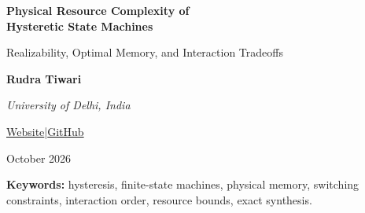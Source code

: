 \documentclass[12pt,letterpaper]{article}
\theoremstyle{definition}\newtheorem{definition}[theorem]{Definition}
\theoremstyle{remark}\newtheorem{remark}[theorem]{Remark}
\begin{document}
\thispagestyle{empty}
\begin{center}
\vspace*{0.26in}
{\LARGE\bfseries Physical Resource Complexity of\\[.15em] Hysteretic State Machines\par}
\vspace{.25in}
{\large Realizability, Optimal Memory, and Interaction Tradeoffs\par}
\vspace{.26in}
{\normalsize\bfseries Rudra Tiwari\par}
\vspace{.025in}
{\normalsize\itshape University of Delhi, India\par}
\vspace{.10in}
{\small\href{https://rtx09x.github.io}{Website}\quad|\quad\href{https://github.com/Rtx09x}{GitHub}\par}
\vspace{.16in}
{\normalsize October 2026\par}
\end{center}
\vspace{.19in}
\begin{abstract}
The number of binary states that a physical device can store does not determine which state transitions it can execute. We study the resources needed to realize a specified finite-state computation with interacting hysterons. One input is a repeated quasistatic scalar excursion; at most one element switches on during the rising half and one switches off during the falling half. This budget forces a constrained geometry on state transitions. We characterize unary transition maps realizable with unrestricted switch count, prove sharp memory bounds for cyclic, resetting, and merging behaviors, and obtain exact tradeoffs among switch count, polynomial interaction order, and directed interaction terms for one-pulse reset. A seven-state task separates pairwise from three-body interactions at three switches; a ten-state counter has exact minima of six and five switches in the respective models. We give near-capacity counter constructions for every period at least three and a finite synthesis procedure with checkable rational witnesses and infeasibility certificates. The analysis identifies the transition structure, rather than state count alone, as an independent determinant of memory cost. All results concern the stated switching-threshold model; terms and incidences are abstract resource counts, not manufacturing costs.
\end{abstract}
\vspace{.12in}
\noindent\textbf{Keywords:} hysteresis, finite-state machines, physical memory, switching constraints, interaction order, resource bounds, exact synthesis.
\clearpage
\tableofcontents
\clearpage
\end{document}
